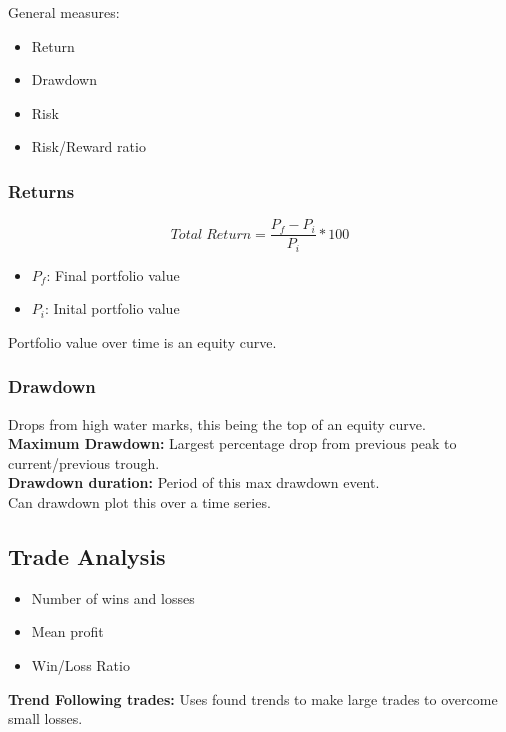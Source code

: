 \documentclass[11pt]{scrartcl} %
\begin{document}
General measures:
\begin{itemize}
	\item Return
	\item Drawdown
	\item Risk
	\item Risk/Reward ratio
\end{itemize}

\subsubsection{Returns}

\[ Total\;Return = \frac{P_f - P_i}{P_i} *100 \]

\begin{itemize}
	\item $P_f$: Final portfolio value
	\item $P_i$: Inital portfolio value
\end{itemize}

Portfolio value over time is an equity curve.

\subsubsection{Drawdown}

Drops from high water marks, this being the top of an equity curve.\\

\textbf{Maximum Drawdown:} Largest percentage drop from previous peak to current/previous trough.\\

\textbf{Drawdown duration:} Period of this max drawdown event.\\

Can drawdown plot this over a time series.

\subsection{Trade Analysis}

\begin{itemize}
	\item Number of wins and losses
	\item Mean profit
	\item Win/Loss Ratio
\end{itemize}

\textbf{Trend Following trades:} Uses found trends to make large trades to overcome small losses.\\
\end{document}
